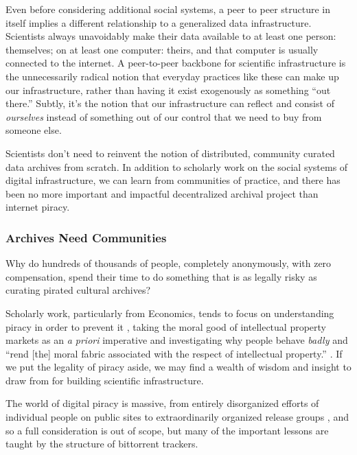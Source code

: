 \documentclass[10pt]{article}
\begin{document}
\begin{multicols}{2}
Even before considering additional social systems, a peer to peer
structure in itself implies a different relationship to a generalized
data infrastructure. Scientists always unavoidably make their data
available to at least one person: themselves; on at least one computer:
theirs, and that computer is usually connected to the internet. A
peer-to-peer backbone for scientific infrastructure is the unnecessarily
radical notion that everyday practices like these can make up our
infrastructure, rather than having it exist exogenously as something
``out there.'' Subtly, it's the notion that our infrastructure can
reflect and consist of \emph{ourselves} instead of something out of our
control that we need to buy from someone else.

Scientists don't need to reinvent the notion of distributed, community
curated data archives from scratch. In addition to scholarly work on the
social systems of digital infrastructure, we can learn from communities
of practice, and there has been no more important and impactful
decentralized archival project than internet piracy.

\hypertarget{archives-need-communities}{%
\subsubsection{Archives Need
Communities}\label{archives-need-communities}}

Why do hundreds of thousands of people, completely anonymously, with
zero compensation, spend their time to do something that is as legally
risky as curating pirated cultural archives?

Scholarly work, particularly from Economics, tends to focus on
understanding piracy in order to prevent it\cite{basamanowiczReleaseGroupsDigital2011, hindujaDeindividuationInternetSoftware2008} , taking the moral good
of intellectual property markets as an \emph{a priori} imperative and
investigating why people behave \emph{badly} and ``rend {[}the{]} moral
fabric associated with the respect of intellectual property.'' \cite{hindujaDeindividuationInternetSoftware2008} . If we put the legality
of piracy aside, we may find a wealth of wisdom and insight to draw from
for building scientific infrastructure.

The world of digital piracy is massive, from entirely disorganized
efforts of individual people on public sites to extraordinarily
organized release groups \cite{basamanowiczReleaseGroupsDigital2011} , and so a full consideration is out of scope, but many of the
important lessons are taught by the structure of bittorrent trackers.


\end{multicols}
\end{document}
